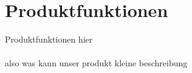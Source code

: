 \chapter{Produktfunktionen}
Produktfunktionen hier\\
\\
also was kann unser produkt kleine beschreibung
